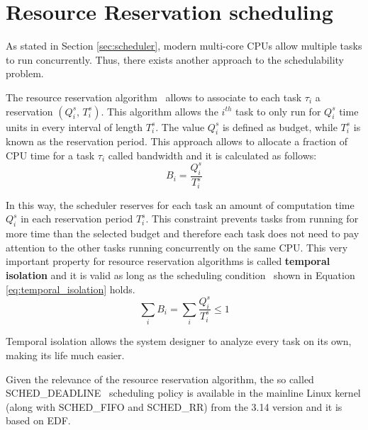 \section{Resource Reservation scheduling}
As stated in Section \ref{sec:scheduler}, modern multi-core CPUs allow multiple
tasks to run concurrently. Thus, there exists another approach to the schedulability
problem.

The resource reservation algorithm~\cite{abeni1998integrating} allows to associate to each task 
\( \tau_{i} \) a reservation \( \left(Q_{i}^s,\,T_{i}^s\right) \).
This algorithm allows the \( i^{th} \) task to only run for \( Q_{i}^s \) time units 
in every interval of length \( T_{i}^s \). The value \( Q_{i}^s \) is defined as
budget, while \( T_{i}^s \) is known as the reservation period.
This approach allows to allocate a fraction of CPU time for a task \( \tau_{i} \)
called bandwidth and it is calculated as follows:
\begin{equation}
    B_{i} = \frac{Q_{i}^s}{T_{i}^s}
\end{equation}

In this way, the scheduler reserves for each task an amount of computation
time \( Q_{i}^s \) in each reservation period \( T_{i}^s \). This constraint
prevents tasks from running for more time than the selected budget and
therefore each task does not need to pay attention to the other tasks running
concurrently on the same CPU. This very important property for resource reservation algorithms is called
\textbf{temporal isolation} and it is valid as long as the scheduling
condition~\cite{lee2007handbook} shown in Equation \ref{eq:temporal_isolation} 
holds.
\begin{equation} \label{eq:temporal_isolation}
    \displaystyle\sum_{i} B_{i} =  \displaystyle\sum_{i} \frac{Q_{i}^s}{T_{i}^s} \leq 1
\end{equation}

Temporal isolation allows the system designer to analyze every
task on its own, making its life much easier.

Given the relevance of the resource reservation algorithm, the so called
SCHED\_DEADLINE~\cite{lelli2016deadline} scheduling policy is available
in the mainline Linux kernel (along with SCHED\_FIFO and SCHED\_RR) from the
3.14 version and it is based on EDF.


